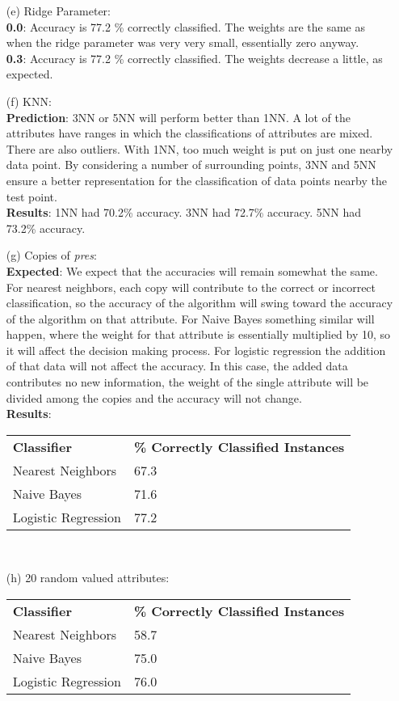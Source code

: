 \documentclass[12pt]{article}
\begin{document}
\begin{enumerate}
\begin{enumerate}
	 \item[(e)] Ridge Parameter: \\
	 	  		\textbf{0.0}: Accuracy is 77.2 \% correctly classified. The weights are the same as when the ridge parameter was very very small, essentially zero anyway. \\
	 	  		\textbf{0.3}: Accuracy is 77.2 \% correctly classified. The weights decrease a little, as expected. \\
	 \item[(f)] KNN: \\
	 			\textbf{Prediction}: 3NN or 5NN will perform better than 1NN. A lot of the attributes have ranges in which the classifications of attributes are mixed. There are also outliers. With 1NN, too much weight is put on just one nearby data point. By considering a number of surrounding points, 3NN and 5NN ensure a better representation for the classification of data points nearby the test point. \\
	 			\textbf{Results}: 1NN had 70.2\% accuracy. 3NN had 72.7\% accuracy. 5NN had 73.2\% accuracy.  \\
	 \item[(g)] Copies of \textit{pres}: \\
	 	\textbf{Expected}: We expect that the accuracies will remain somewhat the same. For nearest neighbors, each copy will contribute to the correct or incorrect classification, so the accuracy of the algorithm will swing toward the accuracy of the algorithm on that attribute. For Naive Bayes something similar will happen, where the weight for that attribute is essentially multiplied by 10, so it will affect the decision making process. For logistic regression the addition of that data will not affect the accuracy. In this case, the added data contributes no new information, the weight of the single attribute will be divided among the copies and the accuracy will not change. \\ 
	 	\textbf{Results}: \\
  		\begin{tabular}{l l}
  			\textbf{Classifier} & \textbf{\% Correctly Classified Instances} \\
  			Nearest Neighbors & 67.3 \\
  			Naive Bayes & 71.6 \\
  			Logistic Regression & 77.2
  		\end{tabular} \\
  		
	\item[(h)] 20 random valued attributes: \\
  		\begin{tabular}{l l}
  			\textbf{Classifier} & \textbf{\% Correctly Classified Instances} \\
  			Nearest Neighbors & 58.7 \\
  			Naive Bayes & 75.0 \\
  			Logistic Regression & 76.0
  		\end{tabular} \\
  	

\end{enumerate}
\end{enumerate}
\end{document}
